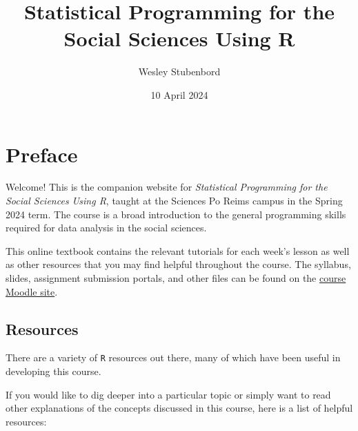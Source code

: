 \documentclass[
  letterpaper,
]{book}
\title{Statistical Programming for the Social Sciences Using R}
\author{Wesley Stubenbord}
\date{10 April 2024}
\renewcommand*\contentsname{Table of contents}
\newcommand\contentsname{Table of contents}
\begin{document}
\frontmatter
\maketitle
\ifdefined\Shaded\renewenvironment{Shaded}{\begin{tcolorbox}[boxrule=0pt, borderline west={3pt}{0pt}{shadecolor}, interior hidden, breakable, enhanced, sharp corners, frame hidden]}{\end{tcolorbox}}\fi

\renewcommand*\contentsname{Table of contents}
{
\setcounter{tocdepth}{2}
\tableofcontents
}
\mainmatter
{}

\hypertarget{preface}{%
\chapter*{Preface}\label{preface}}


Welcome! This is the companion website for \emph{Statistical Programming
for the Social Sciences Using R}, taught at the Sciences Po Reims campus
in the Spring 2024 term. The course is a broad introduction to the
general programming skills required for data analysis in the social
sciences.

This online textbook contains the relevant tutorials for each week's
lesson as well as other resources that you may find helpful throughout
the course. The syllabus, slides, assignment submission portals, and
other files can be found on the
\href{https://moodle.sciences-po.fr/course/view.php?id=40782}{course
Moodle site}.

\hypertarget{resources}{%
\section*{Resources}\label{resources}}


There are a variety of \texttt{R} resources out there, many of which
have been useful in developing this course.

If you would like to dig deeper into a particular topic or simply want
to read other explanations of the concepts discussed in this course,
here is a list of helpful resources:
\end{document}
